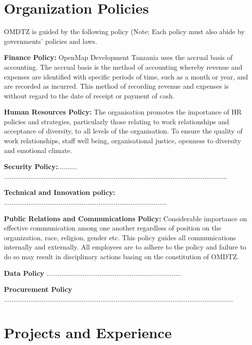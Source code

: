\documentclass[a4paper,12pt,twoside]{article}
\begin{document}
\newpage
\section{Organization Policies}

OMDTZ is guided by the following policy (Note; Each policy must also abide by governments’ policies and laws.

\textbf{Finance Policy:} OpenMap Development Tanzania uses the accrual basis of accounting. The accrual basis is the method of accounting whereby revenue and expenses are identified with specific periods of time, such as a month or year, and are recorded as incurred.  This method of recording revenue and expenses is without regard to the date of receipt or payment of cash.

\textbf{Human Resources Policy:} The organisation promotes the importance of HR policies and strategies, particularly those relating to work relationships and acceptance of diversity, to all levels of the organisation. To ensure the quality of work relationships, staff well being, organisational justice, openness to diversity and emotional climate.

\textbf{Security Policy:}.......... ......................................................................................................................

\textbf{Technical and Innovation policy:}
......................................................................................

\textbf{Public Relations and Communications Policy:} Considerable importance on effective communication among one another regardless of position on the organization, race, religion, gender etc. This policy guides all communications internally and externally. All employees are to adhere to the policy and failure to do so may result in disciplinary actions basing on the constitution of OMDTZ.

\textbf{Data Policy}     .......................................................................

\textbf{Procurement Policy}       .........................................................................................................................

\newpage
\section{Projects and Experience}
\end{document}
